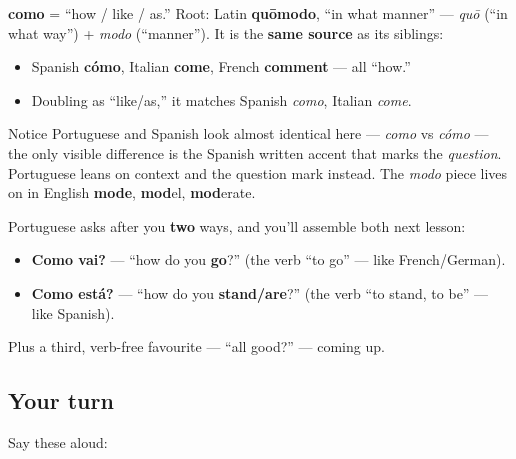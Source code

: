 \begin{cousinweb}
\textbf{como} = \textquotedblleft{}how / like / as.\textquotedblright{} Root: Latin \textbf{quōmodo}, \textquotedblleft{}in what manner\textquotedblright{} — \emph{quō} (\textquotedblleft{}in what way\textquotedblright{}) + \emph{modo} (\textquotedblleft{}manner\textquotedblright{}). It is the \textbf{same source} as its siblings:

\begin{itemize}
\raggedright
  \item Spanish \textbf{cómo}, Italian \textbf{come}, French \textbf{comment} — all \textquotedblleft{}how.\textquotedblright{}
  \item Doubling as \textquotedblleft{}like/as,\textquotedblright{} it matches Spanish \emph{como}, Italian \emph{come}.
\end{itemize}

Notice Portuguese and Spanish look almost identical here — \emph{como} vs \emph{cómo} — the only visible difference is the Spanish written accent that marks the \emph{question}. Portuguese leans on context and the question mark instead. The \emph{modo} piece lives on in English \textbf{mode}, \textbf{mod}el, \textbf{mod}erate.
\end{cousinweb}

\begin{grammarlens}[title={Grammar Lens: the two Portuguese \textquotedblleft{}how are you\textquotedblright{}s}]
Portuguese asks after you \textbf{two} ways, and you'll assemble both next lesson:

\begin{itemize}
\raggedright
  \item \textbf{Como vai?} — \textquotedblleft{}how do you \textbf{go}?\textquotedblright{} (the verb \textquotedblleft{}to go\textquotedblright{} — like French/German).
  \item \textbf{Como está?} — \textquotedblleft{}how do you \textbf{stand/are}?\textquotedblright{} (the verb \textquotedblleft{}to stand, to be\textquotedblright{} — like Spanish).
\end{itemize}

Plus a third, verb-free favourite — \textquotedblleft{}all good?\textquotedblright{} — coming up.
\end{grammarlens}

\subsection*{Your turn}
Say these aloud:

